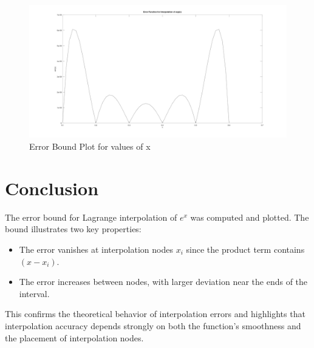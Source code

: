 \begin{figure}[h!]
  \centering
  \includegraphics[width=1.0\textwidth]{a3.jpg}
  \caption{Error Bound Plot for values of x}
  \label{fig:a3}
\end{figure}


\section*{Conclusion}
The error bound for Lagrange interpolation of $e^x$ was computed and plotted. The bound illustrates two key properties:
\begin{itemize}
  \item The error vanishes at interpolation nodes $x_i$ since the product term contains $(x - x_i)$.
  \item The error increases between nodes, with larger deviation near the ends of the interval.
\end{itemize}

This confirms the theoretical behavior of interpolation errors and highlights that interpolation accuracy depends strongly on both the function’s smoothness and the placement of interpolation nodes.
